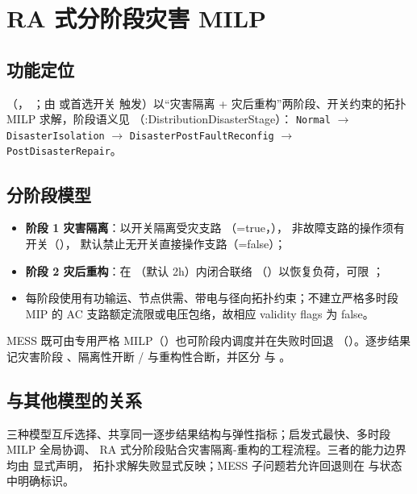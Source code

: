 \section{RA 式分阶段灾害 MILP}\label{sec:res-stage}

\subsection{功能定位}
（，
；由  或首选开关
 触发）以“灾害隔离 + 灾后重构”两阶段、开关约束的拓扑 MILP
求解，阶段语义见 （:DistributionDisasterStage）：
\texttt{Normal} $\to$ \texttt{DisasterIsolation} $\to$ \texttt{DisasterPostFaultReconfig}
$\to$ \texttt{PostDisasterRepair}。

\subsection{分阶段模型}
\begin{itemize}
  \item \textbf{阶段 1 灾害隔离}：以开关隔离受灾支路
        （=true，），
        非故障支路的操作须有开关（），
        默认禁止无开关直接操作支路（=false）；
  \item \textbf{阶段 2 灾后重构}：在 （默认 2h）内闭合联络
        （）以恢复负荷，可限 ；
  \item 每阶段使用有功输运、节点供需、带电与径向拓扑约束；不建立严格多时段 MIP 的 AC
        支路额定流限或电压包络，故相应 validity flags 为 false。
\end{itemize}
MESS 既可由专用严格 MILP（）也可阶段内调度并在失败时回退
（）。逐步结果记灾害阶段 、隔离性开断
/ 与重构性合断，并区分
 与 。

\subsection{与其他模型的关系}
三种模型互斥选择、共享同一逐步结果结构与弹性指标；启发式最快、多时段 MILP 全局协调、
RA 式分阶段贴合灾害隔离-重构的工程流程。三者的能力边界均由  显式声明，
拓扑求解失败显式反映；MESS 子问题若允许回退则在  与状态中明确标识。
